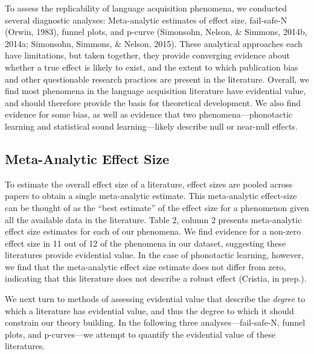 \documentclass[english,floatsintext,man]{apa6}
\begin{document}
To assess the replicability of language acquisition phenomena, we
conducted several diagnostic analyses: Meta-analytic estimates of effect
size, fail-safe-N (Orwin, 1983), funnel plots, and p-curve (Simonsohn,
Nelson, \& Simmons, 2014b, 2014a; Simonsohn, Simmons, \& Nelson, 2015).
These analytical approaches each have limitations, but taken together,
they provide converging evidence about whether a true effect is likely
to exist, and the extent to which publication bias and other
questionable research practices are present in the literature. Overall,
we find most phenomena in the language acquisition literature have
evidential value, and should therefore provide the basis for theoretical
development. We also find evidence for some bias, as well as evidence
that two phenomena---phonotactic learning and statistical sound
learning---likely describe null or near-null effects.

\subsection{Meta-Analytic Effect Size}\label{meta-analytic-effect-size}

To estimate the overall effect size of a literature, effect sizes are
pooled across papers to obtain a single meta-analytic estimate. This
meta-analytic effect-size can be thought of as the \enquote{best
estimate} of the effect size for a phenomenon given all the available
data in the literature. Table 2, column 2 presents meta-analytic effect
size estimates for each of our phenomena. We find evidence for a
non-zero effect size in 11 out of 12 of the phenomena in our dataset,
suggesting these literatures provide evidential value. In the case of
phonotactic learning, however, we find that the meta-analytic effect
size estimate does not differ from zero, indicating that this literature
does not describe a robust effect (Cristia, in prep.).

We next turn to methods of assessing evidential value that describe the
\emph{degree} to which a literature has evidential value, and thus the
degree to which it should constrain our theory building. In the
following three analyses---fail-safe-N, funnel plots, and p-curves---we
attempt to quantify the evidential value of these literatures.
\end{document}
